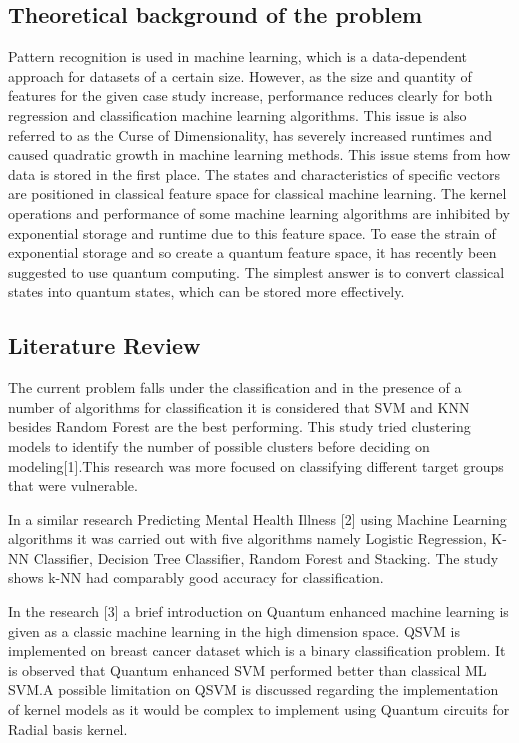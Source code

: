\documentclass[10pt,journal,compsoc]{IEEEtran}
\begin{document}
\subsection{Theoretical background of the problem}
Pattern recognition is used in machine learning, which is a data-dependent approach for datasets of a certain size. However, as the size and quantity of features for the given case study increase, performance reduces clearly for both regression and classification machine learning algorithms.  This issue is also referred to as the Curse of Dimensionality, has severely increased runtimes and caused quadratic growth in machine learning methods. This issue stems from how data is stored in the first place. The states and characteristics of specific vectors are positioned in classical feature space for classical machine learning. The kernel operations and performance of some machine learning algorithms are inhibited by exponential storage and runtime due to this feature space. To ease the strain of exponential storage and so create a quantum feature space, it has recently been suggested to use quantum computing. The simplest answer is to convert classical states into quantum states, which can be stored more effectively. 

\subsection{Literature Review}
The current problem falls under the classification and in the presence of a number of algorithms for classification it is considered that SVM and KNN besides Random Forest are the best performing. This study tried clustering models to identify the number of possible clusters before deciding on modeling[1].This research was more focused on classifying different target groups that were vulnerable.

\quad In a similar research Predicting Mental Health Illness [2] using Machine Learning algorithms it was carried out with five algorithms namely Logistic Regression, K-NN Classifier, Decision Tree Classifier, Random Forest and Stacking. The study shows k-NN had comparably good accuracy for classification.

\quad In the research [3] a brief introduction on Quantum enhanced machine learning is given as a classic machine learning in the high dimension space. QSVM is implemented on breast cancer dataset which is a binary classification problem. It is observed that Quantum enhanced SVM performed better than classical ML SVM.A possible limitation on QSVM is discussed regarding the implementation of kernel models as it would be complex to implement using Quantum circuits for Radial basis kernel.
\end{document}
